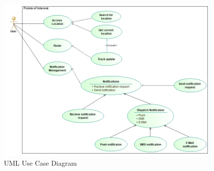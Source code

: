 \begin{figure}[H]\includegraphics[width=\textwidth]{UseCaseDiagram}
\caption{UML Use Case Diagram}
\end{figure}
	

